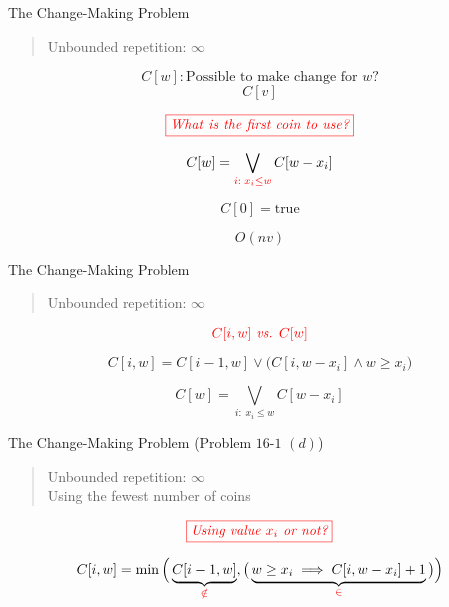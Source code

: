 \begin{frame}{}
  \begin{exampleblock}{The Change-Making Problem}
    \begin{quote}
      \centering
      Unbounded repetition: $\infty$
    \end{quote}
  \end{exampleblock}

  \pause
  \[
    C[w]: \text{Possible to make change for $w$?}
  \]
  \[
    C[v]
  \]

  \pause
  \[
    \textcolor{red}{\fbox{\it What is the first coin to use?}}
  \]
  
  \pause
  \[
    C[w] = \bigvee_{\textcolor{red}{i: \; x_i \le w}} C[w-x_i]
  \]

  \pause
  \[
    C[0] = \text{true}
  \]

  \pause
  \[
    O(nv)
  \]
\end{frame}

\begin{frame}{}
  \begin{exampleblock}{The Change-Making Problem}
    \begin{quote}
      \centering
      Unbounded repetition: $\infty$
    \end{quote}
  \end{exampleblock}

  \[
    \textcolor{red}{C[i,w] \text{\emph{ vs. }} C[w]}
  \]

  \[
    C[i,w] = C[i-1, w] \lor \big(C[i, w-x_{i}] \land w \ge x_{i}\big)
  \]

  \[
    C[w] = \bigvee_{i: \; x_i \le w} C[w-x_i]
  \]
\end{frame}

\begin{frame}{}
  \begin{exampleblock}{The Change-Making Problem (Problem $16$-$1$ $(d)$)}
    \begin{quote}
      \centering
      Unbounded repetition: $\infty$ \\[8pt]
      Using the fewest number of coins
    \end{quote}
  \end{exampleblock}

  \pause
  \[
    \textcolor{red}{\fbox{\it Using value $x_{i}$ or not?}}
  \]

  \vspace{0.30cm}
  \[
    C[i,w] = \min\Big( \underbrace{C[i-1, w]}_{\textcolor{red}{\notin}}, \big(\underbrace{w \ge x_{i} \implies C[i, w-x_{i}] + 1}_{\textcolor{red}{\in}} \big) \Big)
  \]
\end{frame}

